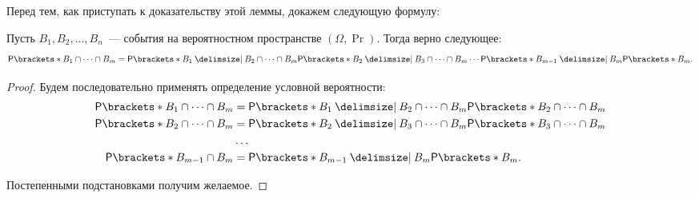 Перед тем, как приступать к доказательству этой леммы, докажем следующую формулу:
\begin{theorem}
    Пусть \(B_1, B_2, \dots, B_n\)~--- события на вероятностном пространстве \((\Omega, \Pr)\). Тогда верно следующее:
    \[\Pr{B_1 \cap \dots \cap B_m} = \Pr{B_1 \given B_2 \cap \dots \cap B_m}\Pr{B_2 \given B_3 \cap \dots \cap B_m} \dotsm \Pr{B_{m-1} \given B_m}\Pr{B_m}.\]
\end{theorem}
\begin{proof}
    Будем последовательно применять определение условной вероятности:
    \[\begin{aligned}
    \Pr{B_1 \cap \dots \cap B_m} &= \Pr{B_1 \given B_2 \cap \dots \cap B_m}\Pr{B_2 \cap \dots \cap B_m} \\
    \Pr{B_2 \cap \dots \cap B_m} &= \Pr{B_2 \given B_3 \cap \dots \cap B_m}\Pr{B_3 \cap \dots \cap B_m} \\
    &\dots \\
    \Pr{B_{m - 1} \cap B_m}&= \Pr{B_{m-1} \given B_m}\Pr{B_m}.
    \end{aligned}\]
    
    Постепенными подстановками получим желаемое.
\end{proof}

